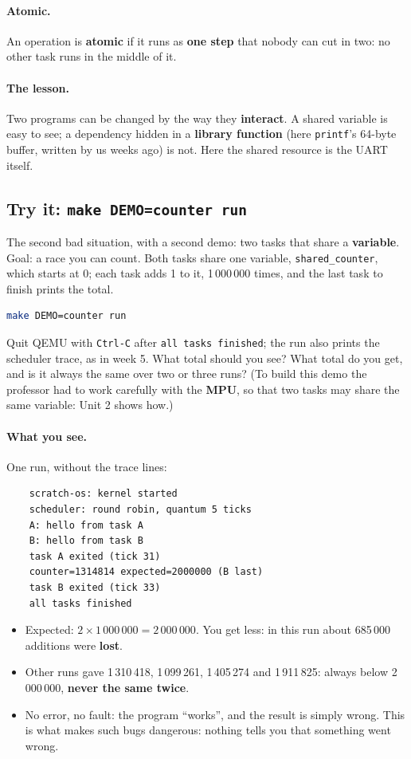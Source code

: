 \paragraph{Atomic.} An operation is \textbf{atomic} if it runs as \textbf{one step} that nobody can cut in two: no other task runs in the middle of it.

\paragraph{The lesson.} Two programs can be changed by the way they \textbf{interact}. A shared variable is easy to see; a dependency hidden in a \textbf{library function} (here \texttt{printf}'s 64-byte buffer, written by us weeks ago) is not. Here the shared resource is the UART itself.

\subsection{Try it: \texttt{make DEMO=counter run}}
The second bad situation, with a second demo: two tasks that share a \textbf{variable}. Goal: a race you can count. Both tasks share one variable, \texttt{shared\_counter}, which starts at 0; each task adds 1 to it, 1\,000\,000 times, and the last task to finish prints the total.
\begin{lstlisting}[language=bash]
    make DEMO=counter run
\end{lstlisting}
Quit QEMU with \texttt{Ctrl-C} after \texttt{all tasks finished}; the run also prints the scheduler trace, as in week 5. What total should you see? What total do you get, and is it always the same over two or three runs? (To build this demo the professor had to work carefully with the \textbf{MPU}, so that two tasks may share the same variable: Unit 2 shows how.)

\paragraph{What you see.} One run, without the trace lines:
\begin{verbatim}
    scratch-os: kernel started
    scheduler: round robin, quantum 5 ticks
    A: hello from task A
    B: hello from task B
    task A exited (tick 31)
    counter=1314814 expected=2000000 (B last)
    task B exited (tick 33)
    all tasks finished
\end{verbatim}
\begin{itemize}
    \item Expected: $2 \times 1\,000\,000 = 2\,000\,000$. You get less: in this run about 685\,000 additions were \textbf{lost}.
    \item Other runs gave 1\,310\,418, 1\,099\,261, 1\,405\,274 and 1\,911\,825: always below 2\,000\,000, \textbf{never the same twice}.
    \item No error, no fault: the program ``works'', and the result is simply wrong. This is what makes such bugs dangerous: nothing tells you that something went wrong.
\end{itemize}

